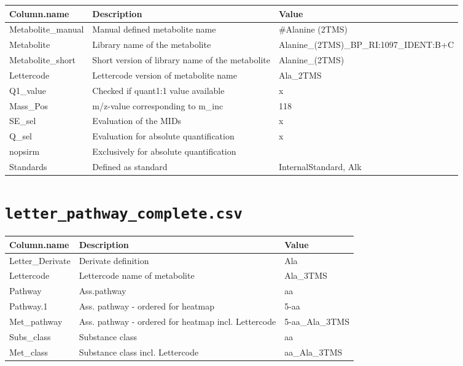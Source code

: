 \documentclass[]{book}
\begin{document}
\begin{tabu} to 
\toprule
Column.name & Description & Value\\
\midrule
{}  Metabolite\_manual & Manual defined metabolite name & \#Alanine (2TMS)\\
Metabolite & Library name of the metabolite & Alanine\_(2TMS)\_BP\_RI:1097\_IDENT:B+C\\
  Metabolite\_short & Short version of library name of the metabolite & Alanine\_(2TMS)\\
Lettercode & Lettercode version of metabolite name & Ala\_2TMS\\
  Q1\_value & Checked if quant1:1 value available & x\\
\addlinespace
Mass\_Pos & m/z-value corresponding to m\_inc & 118\\
  SE\_sel & Evaluation of the MIDs & x\\
Q\_sel & Evaluation for absolute quantification & x\\
  nopsirm & Exclusively for absolute quantification & \\
Standards & Defined as standard & InternalStandard, Alk\\
\bottomrule
\end{tabu}

\hypertarget{letter_pathway_complete.csv}{%
\section{\texorpdfstring{\texttt{letter\_pathway\_complete.csv}}{letter\_pathway\_complete.csv}}\label{letter_pathway_complete.csv}}

\begin{tabu} to 
\toprule
Column.name & Description & Value\\
\midrule
{}  Letter\_Derivate & Derivate definition & Ala\\
Lettercode & Lettercode name of metabolite & Ala\_3TMS\\
  Pathway & Ass.pathway & aa\\
Pathway.1 & Ass. pathway - ordered for heatmap & 5-aa\\
  Met\_pathway & Ass. pathway - ordered for heatmap incl. Lettercode & 5-aa\_Ala\_3TMS\\
\addlinespace
Subs\_class & Substance class & aa\\
  Met\_class & Substance class incl. Lettercode & aa\_Ala\_3TMS\\
\bottomrule
\end{tabu}
\end{document}
